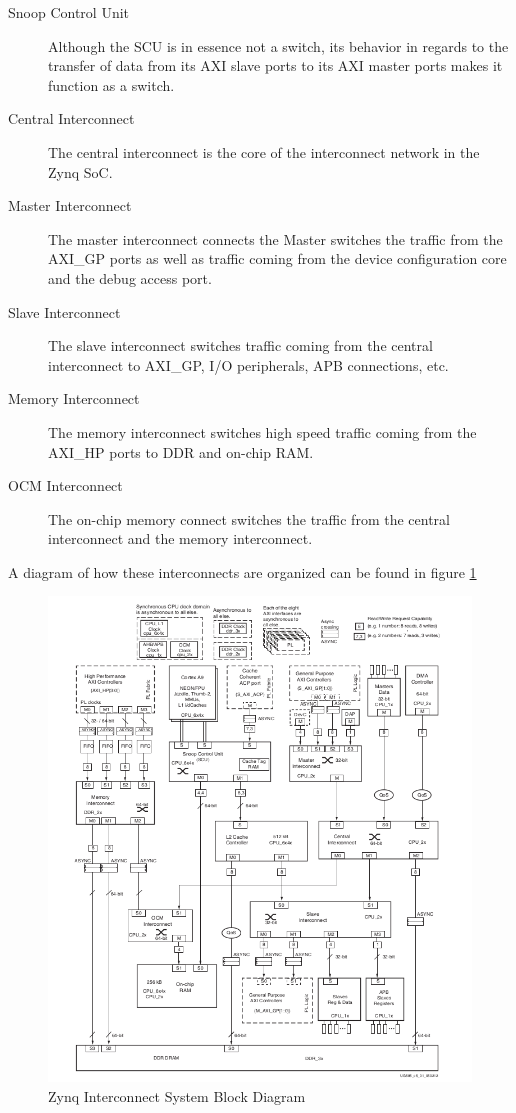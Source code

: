 		\begin{description}
			\item[Snoop Control Unit] Although the SCU is in essence not a switch, its behavior in regards to the transfer of data from its AXI slave ports to its AXI master ports makes it function as a switch.
			\item[Central Interconnect] The central interconnect is the core of the interconnect network in the Zynq SoC.\
			\item[Master Interconnect] The master interconnect connects the Master switches the traffic from the AXI\_GP ports as well as traffic coming from the device configuration core and the debug access port.
			\item[Slave Interconnect] The slave interconnect switches traffic coming from the central interconnect to AXI\_GP, I/O peripherals, APB connections, etc.
			\item[Memory Interconnect] The memory interconnect switches high speed traffic coming from the AXI\_HP ports to DDR and on-chip RAM.
			\item[OCM Interconnect] The on-chip memory connect switches the traffic from the central interconnect and the memory interconnect.
		\end{description}

		A diagram of how these interconnects are organized can be found in figure \ref{img:zynq_intereconnect}

\begin{figure}[H]
\centering
\includegraphics[scale=0.55]{./images/interconnect_block_diagram.png}
\caption{Zynq Interconnect System Block Diagram \cite{anon._zynq-7000_2013}}
\label{img:zynq_intereconnect}
\end{figure}

